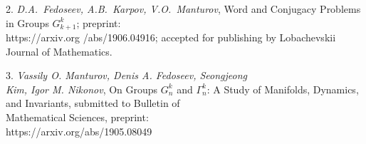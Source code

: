 2. {\it D.A.~Fedoseev, A.B.~Karpov, V.O.~Manturov}, Word and Conjugacy Problems in Groups $G_{k+1}^{k}$; preprint: \\https://arxiv.org /abs/1906.04916; accepted for publishing by Lobachevskii Journal of Mathematics.

3. {\it Vassily O. Manturov, Denis A. Fedoseev, Seongjeong \\Kim, Igor M. Nikonov}, On Groups $G^k_n$ and $\Gamma^k_n$: A Study of Manifolds, Dynamics, and Invariants, submitted to Bulletin of \\Mathematical Sciences, preprint: \\https://arxiv.org/abs/1905.08049
